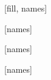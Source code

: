 \documentclass{article}
\begin{document}
[fill, names]
\newline

\newline

\newline

\newline

[names]
\newline

[names]
\newline

[names]
\end{document}
